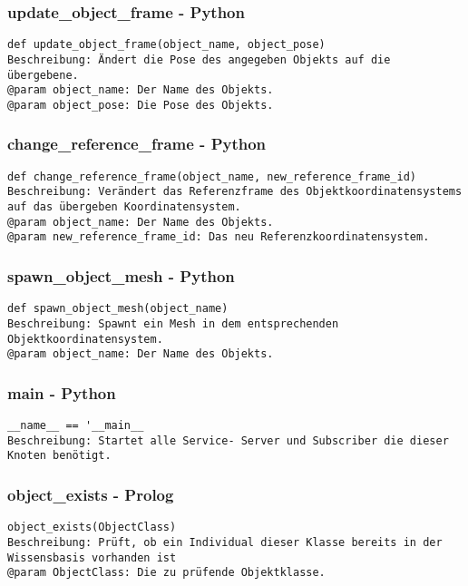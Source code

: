 \documentclass{suturo}
\begin{document}
\subsubsection{update\_object\_frame - Python}
\begin{verbatim}
def update_object_frame(object_name, object_pose)
Beschreibung: Ändert die Pose des angegeben Objekts auf die übergebene.
@param object_name: Der Name des Objekts.
@param object_pose: Die Pose des Objekts.
\end{verbatim}

\subsubsection{change\_reference\_frame - Python}
\begin{verbatim}
def change_reference_frame(object_name, new_reference_frame_id)
Beschreibung: Verändert das Referenzframe des Objektkoordinatensystems 
auf das übergeben Koordinatensystem.
@param object_name: Der Name des Objekts.
@param new_reference_frame_id: Das neu Referenzkoordinatensystem.
\end{verbatim}

\subsubsection{spawn\_object\_mesh - Python}
\begin{verbatim}
def spawn_object_mesh(object_name)
Beschreibung: Spawnt ein Mesh in dem entsprechenden Objektkoordinatensystem.
@param object_name: Der Name des Objekts.
\end{verbatim}

\subsubsection{main - Python}
\begin{verbatim}
__name__ == '__main__
Beschreibung: Startet alle Service- Server und Subscriber die dieser Knoten benötigt.
\end{verbatim}

\subsubsection{object\_exists - Prolog}
\begin{verbatim}
object_exists(ObjectClass)
Beschreibung: Prüft, ob ein Individual dieser Klasse bereits in der
Wissensbasis vorhanden ist
@param ObjectClass: Die zu prüfende Objektklasse.
\end{verbatim}
\end{document}
